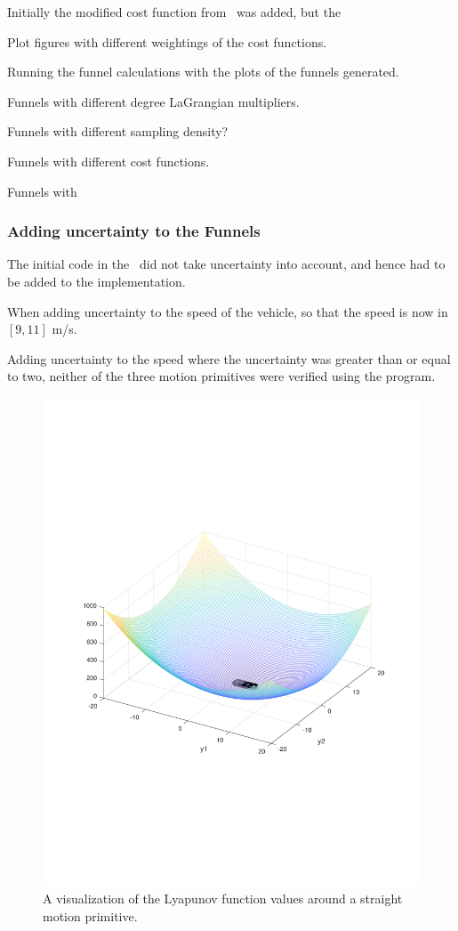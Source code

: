 Initially the modified cost function
from~\cite{majumdarFunnelLibrariesRealtime2017} was added, but the

Plot figures with different weightings of the cost functions.

Running the funnel calculations with the plots of the funnels generated.

Funnels with different degree LaGrangian multipliers.

Funnels with different sampling density?

Funnels with different cost functions.

Funnels with

\subsubsection{Adding uncertainty to the Funnels}

The initial code in the~\cite[Drake toolbox]{drake} did not take uncertainty
into account, and hence had to be added to the implementation.

When adding uncertainty to the speed of the vehicle, so that the speed is now in
\([9,11]\) m/s.

Adding uncertainty to the speed where the uncertainty was greater than or equal
to two, neither of the three motion primitives were verified using the program.

\begin{figure}
  \centering
  \includegraphics[scale=.3]{figures/rrtfunnel/straight-funnel-lyapunov-3d}
  \caption{A visualization of the Lyapunov function values around a straight
    motion primitive.}
\end{figure}


